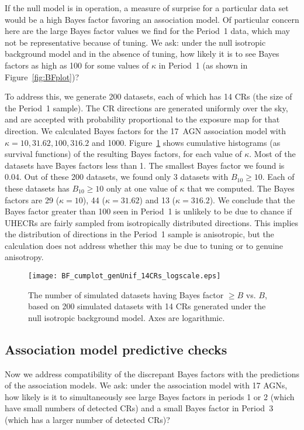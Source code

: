 If the null model is in operation, a measure of surprise for a particular data
set would be a high Bayes factor favoring an association model.  Of particular
concern here are the large Bayes factor values we find for the Period~1 data,
which may not be representative because of tuning.  We ask:  under the null
isotropic background model and in the absence of tuning, how likely it is to
see Bayes factors as high as 100 for some values of $\kappa$ in Period~1 (as
shown in Figure~\ref{fig:BFplot})?

To address this, we generate 200 datasets, each of which has 14 CRs (the
size of the Period~1 sample).  The CR
directions are generated uniformly over the sky, and are accepted with
probability proportional to the exposure map for that direction.  We
calculated Bayes factors for the 17~AGN association model with $\kappa = 10,
31.62, 100, 316.2$ and 1000.
Figure~\ref{fig:unifCumBF} shows cumulative histograms (as survival
functions) of the resulting Bayes factors, for each value of $\kappa$.  Most
of the datasets have Bayes factors less than 1. The smallest Bayes factor we
found is 0.04. Out of these 200 datasets, we found only 3 datasets with
$B_{10} \geq 10$.  Each of these datasets has $B_{10} \geq 10$ only at one
value of $\kappa$ that we computed. The Bayes factors are 29 ($\kappa=10$),
44 ($\kappa = 31.62$) and 13 ($\kappa = 316.2$).  We conclude that the Bayes
factor greater than 100 seen in Period~1 is unlikely to be due to chance if
UHECRs are fairly sampled from isotropically distributed directions.  This
implies the distribution of directions in the Period~1 sample is
anisotropic, but the calculation does not address whether this may be due to
tuning or to genuine anisotropy.

\begin{figure}
\centerline{\texttt{[image: BF\_cumplot\_genUnif\_14CRs\_logscale.eps]}}
\caption{The number of simulated datasets having Bayes factor $\geq B$
vs. $B$, based on 200 simulated datasets with 14 CRs generated under the
null isotropic background model.  Axes are logarithmic.}
\label{fig:unifCumBF}
\end{figure}

\subsection{Association model predictive checks}

Now we address compatibility of the discrepant Bayes factors with the
predictions of the association models.  We ask: under the association model
with 17 AGNs, how likely is it to simultaneously see large Bayes factors in
periods 1 or 2 (which have small numbers of detected CRs) and a small Bayes
factor in Period~3 (which has a larger number of detected CRs)?

